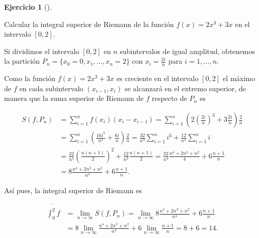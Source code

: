 \documentclass[
  spanish,
  a4paper,
]{scrreport}
\theoremstyle{definition}
\newtheorem{exercise}{Ejercicio}[chapter]
\theoremstyle{remark}
\begin{document}
\begin{exercise}[]\protect\hypertarget{exr-5}{}\label{exr-5}

Calcular la integral superior de Riemann de la función \(f(x)=2x^3+3x\)
en el intervalo \([0,2]\).

\end{exercise}

\begin{tcolorbox}[enhanced jigsaw, arc=.35mm, bottomrule=.15mm, bottomtitle=1mm, breakable, colback=white, colbacktitle=quarto-callout-tip-color!10!white, colframe=quarto-callout-tip-color-frame, coltitle=black, left=2mm, leftrule=.75mm, opacityback=0, opacitybacktitle=0.6, rightrule=.15mm, title=\textcolor{quarto-callout-tip-color}{\faLightbulb}\hspace{0.5em}{Solución}, titlerule=0mm, toprule=.15mm, toptitle=1mm]

Si dividimos el intervalo \([0,2]\) en \(n\) subintervalos de igual
amplitud, obtenemos la partición \(P_n=\{x_0=0,x_1,\ldots,x_n=2\}\) con
\(x_i=\frac{2i}{n}\) para \(i=1,\ldots,n\).

Como la función \(f(x)=2x^3+3x\) es creciente en el intervalo \([0,2]\)
el máximo de \(f\) en cada subintervalo \((x_{i-1},x_i)\) se alcanzará
en el extremo superior, de manera que la suma superior de Riemann de
\(f\) respecto de \(P_n\) es

\begin{align*}
S(f,P_n) 
&= \sum_{i=1}^n f(x_i)(x_i-x_{i-1}) 
=  \sum_{i=1}^n \left(2\left(\frac{2i}{n}\right)^3 + 3\frac{2i}{n}\right) \frac{2}{n} \\
&= \sum_{i=1}^n \left(\frac{16i^3}{n^3} + \frac{6i}{n}\right) \frac{2}{n} 
= \frac{32}{n^4}\sum_{i=1}^n i^3 + \frac{12}{n^2} \sum_{i=1}^n i \\
&= \frac{32}{n^4}\left(\frac{n(n+1)}{2}\right)^2 + \frac{12}{n^2} \frac{n(n+1)}{2} =  \frac{32}{n^4}\frac{n^4+2n^3+n^2}{4} + 6 \frac{n+1}{n} \\
&= 8\frac{n^4+2n^3+n^2}{n^4} + 6 \frac{n+1}{n}.
\end{align*}

Así pues, la integral superior de Riemann es

\begin{align*}
\overline{\int_0^2}f 
&= \lim_{n\to\infty} S(f,P_n) 
= \lim_{n\to\infty} 8\frac{n^4+2n^3+n^2}{n^4} + 6 \frac{n+1}{n} \\
&= 8 \lim_{n\to\infty} \frac{n^4+2n^3+n^2}{n^4} + 6 \lim_{n\to\infty}\frac{n+1}{n} 
= 8 + 6 = 14.
\end{align*}

\end{tcolorbox}
\end{document}
